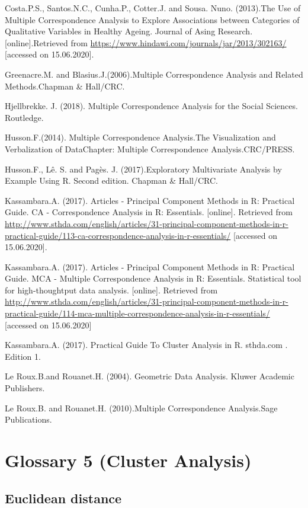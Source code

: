 \documentclass[]{book}
\begin{document}
Costa.P.S., Santos.N.C., Cunha.P., Cotter.J. and Sousa. Nuno. (2013).The Use of Multiple Correspondence Analysis to Explore Associations between Categories of Qualitative Variables in Healthy Ageing. Journal of Asing Research. {[}online{]}.Retrieved from \url{https://www.hindawi.com/journals/jar/2013/302163/} {[}accessed on 15.06.2020{]}.

Greenacre.M. and Blasius.J.(2006).Multiple Correspondence Analysis and Related Methods.Chapman \& Hall/CRC.

Hjellbrekke. J. (2018). Multiple Correspondence Analysis for the Social Sciences. Routledge.

Husson.F.(2014). Multiple Correspondence Analysis.The Visualization and Verbalization of DataChapter: Multiple Correspondence Analysis.CRC/PRESS.

Husson.F., Lê. S. and Pagès. J. (2017).Exploratory Multivariate Analysis by Example Using R. Second edition. Chapman \& Hall/CRC.

Kassambara.A. (2017). Articles - Principal Component Methods in R: Practical Guide. CA - Correspondence Analysis in R: Essentials. {[}online{]}. Retrieved from \url{http://www.sthda.com/english/articles/31-principal-component-methods-in-r-practical-guide/113-ca-correspondence-analysis-in-r-essentials/} {[}accessed on 15.06.2020{]}.

Kassambara.A. (2017). Articles - Principal Component Methods in R: Practical Guide. MCA - Multiple Correspondence Analysis in R: Essentials. Statistical tool for high-thoughtput data analysis. {[}online{]}. Retrieved from \url{http://www.sthda.com/english/articles/31-principal-component-methods-in-r-practical-guide/114-mca-multiple-correspondence-analysis-in-r-essentials/} {[}accessed on 15.06.2020{]}

Kassambara.A. (2017). Practical Guide To Cluster Analysis in R. sthda.com . Edition 1.

Le Roux.B.and Rouanet.H. (2004). Geometric Data Analysis. Kluwer Academic Publishers.

Le Roux.B. and Rouanet.H. (2010).Multiple Correspondence Analysis.Sage Publications.

\hypertarget{glossary-5-cluster-analysis}{%
\chapter{Glossary 5 (Cluster Analysis)}\label{glossary-5-cluster-analysis}}

\hypertarget{euclidean-distance}{%
\section{Euclidean distance}\label{euclidean-distance}}
\end{document}
